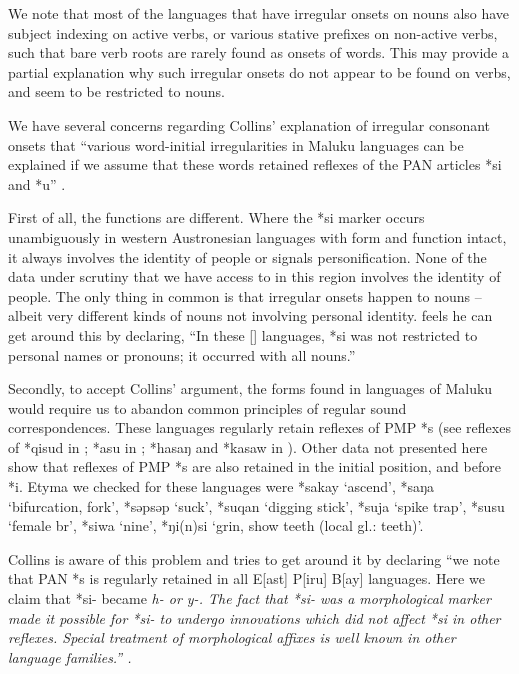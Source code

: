 We note that most of the languages that have irregular onsets
on nouns also have subject indexing on active verbs,
or various stative prefixes on non-active verbs,
such that bare verb roots are rarely found as onsets of words.
This may provide a partial explanation why such irregular onsets
do not appear to be found on verbs,
and seem to be restricted to nouns.

We have several concerns regarding Collins’ explanation of irregular
consonant onsets that “various word-initial irregularities in
 Maluku languages can be explained if we assume that these
words retained reflexes of the PAN articles *si and *u” \citep[6]{Collins1983}.

First of all, the functions are different.
Where the *si marker occurs unambiguously in western Austronesian
languages with form and function intact, it always involves the identity of people or signals personification.
None of the data under scrutiny that we have access to in this
region involves the identity of people.
The only thing in common is that irregular onsets happen to nouns -- albeit
very different kinds of nouns not involving personal identity.
\citet[124]{Collins1983} feels he can get around this by declaring,
“In these [] languages,
*si was not restricted to personal names or pronouns; it occurred
with all nouns.” 

Secondly, to accept Collins’ argument,
the forms found in languages of Maluku would require us to abandon
common principles of regular sound correspondences.
These languages regularly retain reflexes of PMP *s (see reflexes
of *qisud in ; *asu in ; *hasaŋ
and *kasaw in ).
Other data not presented here show that reflexes of PMP *s are
also retained in the initial position, and before *i.
Etyma we checked for these languages were *sakay ‘ascend’,
*saŋa ‘bifurcation, fork’, *səpsəp ‘suck’, *suqan ‘digging stick’,
*suja ‘spike trap’, *susu ‘female br’, *siwa ‘nine’,
*ŋi(n)si ‘grin, show teeth (local gl.: teeth)’.

Collins is aware of this problem
and tries to get around it by declaring “we note that PAN *s
is regularly retained in all E[ast] P[iru] B[ay] languages.
Here we claim that *si- became \it{h-} or \it{y-}.
The fact that *si- was a morphological marker made it possible
for *si- to undergo innovations which did not affect *si in other reflexes.
Special treatment of morphological affixes is
well known in other language families.” \citep[124f]{Collins1983}.

